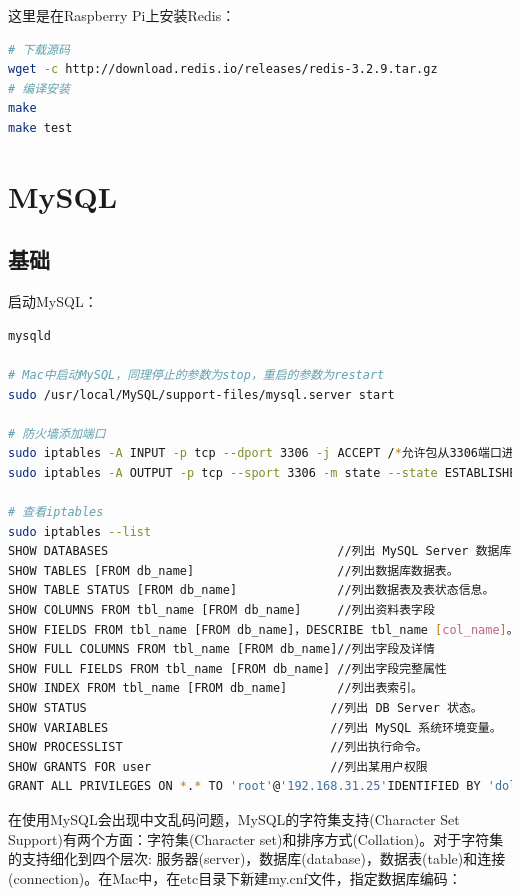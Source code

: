 \documentclass[letter]{book}
\begin{document}
这里是在Raspberry Pi上安装Redis：

\begin{lstlisting}[language=Bash]
# 下载源码
wget -c http://download.redis.io/releases/redis-3.2.9.tar.gz
# 编译安装
make
make test
\end{lstlisting}


\section{MySQL}






\subsection{基础}

启动MySQL：

\begin{lstlisting}[language=Bash]
mysqld

# Mac中启动MySQL，同理停止的参数为stop，重启的参数为restart
sudo /usr/local/MySQL/support-files/mysql.server start

# 防火墙添加端口
sudo iptables -A INPUT -p tcp --dport 3306 -j ACCEPT /*允许包从3306端口进入*/
sudo iptables -A OUTPUT -p tcp --sport 3306 -m state --state ESTABLISHED -j ACCEPT /*允许从3306端口进入的包返回*/

# 查看iptables
sudo iptables --list
SHOW DATABASES                                //列出 MySQL Server 数据库。
SHOW TABLES [FROM db_name]                    //列出数据库数据表。
SHOW TABLE STATUS [FROM db_name]              //列出数据表及表状态信息。
SHOW COLUMNS FROM tbl_name [FROM db_name]     //列出资料表字段
SHOW FIELDS FROM tbl_name [FROM db_name]，DESCRIBE tbl_name [col_name]。
SHOW FULL COLUMNS FROM tbl_name [FROM db_name]//列出字段及详情
SHOW FULL FIELDS FROM tbl_name [FROM db_name] //列出字段完整属性
SHOW INDEX FROM tbl_name [FROM db_name]       //列出表索引。
SHOW STATUS                                  //列出 DB Server 状态。
SHOW VARIABLES                               //列出 MySQL 系统环境变量。
SHOW PROCESSLIST                             //列出执行命令。
SHOW GRANTS FOR user                         //列出某用户权限
GRANT ALL PRIVILEGES ON *.* TO 'root'@'192.168.31.25'IDENTIFIED BY 'dolphin' WITH GRANT OPTION;
\end{lstlisting}

在使用MySQL会出现中文乱码问题，MySQL的字符集支持(Character Set Support)有两个方面：字符集(Character set)和排序方式(Collation)。对于字符集的支持细化到四个层次: 服务器(server)，数据库(database)，数据表(table)和连接(connection)。在Mac中，在etc目录下新建my.cnf文件，指定数据库编码：
\end{document}
